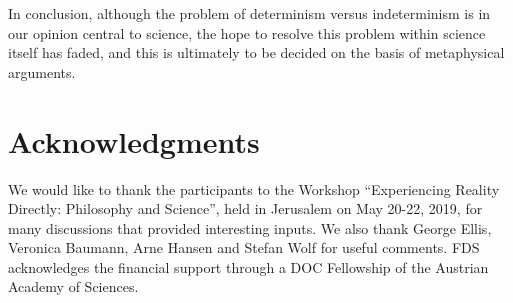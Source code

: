 \documentclass[12pt]{article}
\begin{document}
In conclusion, although the problem of determinism versus indeterminism is in our opinion central to science, the hope to resolve this problem within science itself has faded, and this is ultimately to be decided on the basis of metaphysical arguments.


\section{Acknowledgments}
We would like to thank the participants to the Workshop ``Experiencing  Reality Directly: Philosophy and Science'', held in Jerusalem on May 20-22, 2019, for many discussions that provided interesting inputs. We also thank George Ellis, Veronica Baumann, Arne Hansen and Stefan Wolf for useful comments. FDS acknowledges the financial support through a DOC Fellowship of the Austrian Academy of Sciences.
\end{document}

